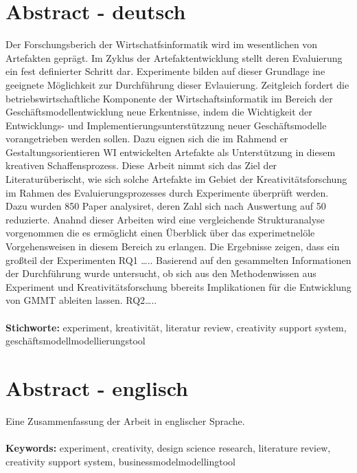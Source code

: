 \section*{Abstract - deutsch}
Der Forschungsberich der Wirtschatfsinformatik wird im wesentlichen von Artefakten geprägt. Im Zyklus der Artefaktentwicklung stellt deren Evaluierung ein fest definierter Schritt dar. Experimente bilden auf dieser Grundlage ine geeignete Möglichkeit zur Durchführung dieser Evlauierung.  Zeitgleich fordert die betriebswirtschaftliche Komponente der Wirtschaftsinformatik im Bereich der Geschäftsmodellentwicklung neue Erkentnisse, indem die Wichtigkeit der Entwicklungs- und Implementierungsunterstützzung neuer Geschäftsmodelle  vorangetrieben werden sollen. Dazu eignen sich die im Rahmend er Gestaltungsorientieren WI entwickelten Artefakte als Unterstützung in diesem kreativen Schaffensprozess.  Diese Arbeit nimmt sich das Ziel der Literaturüberischt, wie sich solche Artefakte im Gebiet der Kreativitätsforschung im Rahmen des Evaluierungsprozesses durch Experimente überprüft werden. Dazu wurden 850 Paper analysiret, deren Zahl sich nach Auswertung auf 50 reduzierte. Anahnd dieser Arbeiten wird eine vergleichende Strukturanalyse vorgenommen die es ermöglicht einen Überblick über das experimetnelöle Vorgehensweisen in diesem Bereich zu erlangen. Die Ergebnisse zeigen, dass ein großteil der Experimenten RQ1 ….. Basierend auf den gesammelten Informationen der Durchführung wurde untersucht, ob sich aus den Methodenwissen aus Experiment und Kreativitätsforschung bbereits Implikationen für die Entwicklung von GMMT ableiten lassen. RQ2…..  \\\\
{\bf Stichworte:} experiment, kreativität, literatur review, creativity support system, geschäftsmodellmodellierungstool

\section*{Abstract - englisch}
Eine Zusammenfassung der Arbeit in englischer Sprache.
\\\\
{\bf Keywords:} experiment, creativity, design science research, literature review, creativity support system, businessmodelmodellingtool 
\\\\\\



